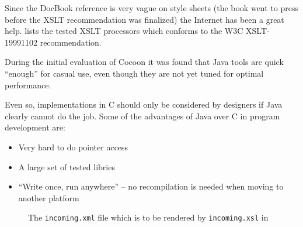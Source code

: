 Since the DocBook reference is very vague on style sheets (the book
went to press before the XSLT recommendation was finalized) the
Internet has been a great help.  
lists the tested XSLT processors which conforms to the W3C
XSLT-19991102 recommendation.



      

      

During the initial evaluation of Cocoon it was found that Java tools
are quick ``enough'' for casual use, even though they are not yet
tuned for optimal performance.


Even so, implementations in C should only be considered by designers
if Java clearly cannot do the job.  Some of the advantages of Java
over C in program development are:

\begin{itemize}
\item Very hard to do pointer access
\item A large set of tested libries
\item ``Write once, run anywhere'' -- no recompilation is needed when
  moving to another platform
\end{itemize}

\begin{figure}[tbp]
  \begin{center}
    \caption{The \texttt{incoming.xml} file which is to be rendered by
      \texttt{incoming.xsl} in
      } 
    \label{fig:src-public_html-incoming.xml}
  \end{center}
\end{figure}

